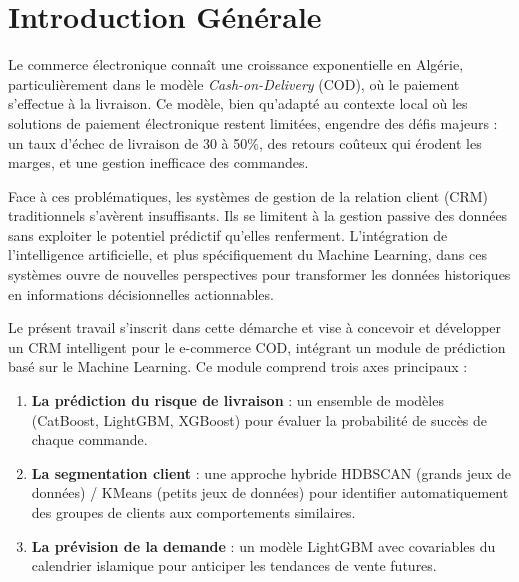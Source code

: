 \documentclass[12pt,a4paper]{report}
\begin{document}

\tableofcontents
\newpage

\listoffigures
\newpage

\listoftables
\newpage


\chapter*{Introduction G\'{e}n\'{e}rale}

Le commerce \'{e}lectronique conna\^{i}t une croissance exponentielle en Alg\'{e}rie, particuli\`{e}rement dans le mod\`{e}le \textit{Cash-on-Delivery} (COD), o\`{u} le paiement s'effectue \`{a} la livraison. Ce mod\`{e}le, bien qu'adapt\'{e} au contexte local o\`{u} les solutions de paiement \'{e}lectronique restent limit\'{e}es, engendre des d\'{e}fis majeurs : un taux d'\'{e}chec de livraison de 30 \`{a} 50\%, des retours co\^{u}teux qui \'{e}rodent les marges, et une gestion inefficace des commandes.

Face \`{a} ces probl\'{e}matiques, les syst\`{e}mes de gestion de la relation client (CRM) traditionnels s'av\`{e}rent insuffisants. Ils se limitent \`{a} la gestion passive des donn\'{e}es sans exploiter le potentiel pr\'{e}dictif qu'elles renferment. L'int\'{e}gration de l'intelligence artificielle, et plus sp\'{e}cifiquement du Machine Learning, dans ces syst\`{e}mes ouvre de nouvelles perspectives pour transformer les donn\'{e}es historiques en informations d\'{e}cisionnelles actionnables.

Le pr\'{e}sent travail s'inscrit dans cette d\'{e}marche et vise \`{a} concevoir et d\'{e}velopper un CRM intelligent pour le e-commerce COD, int\'{e}grant un module de pr\'{e}diction bas\'{e} sur le Machine Learning. Ce module comprend trois axes principaux :

\begin{enumerate}
  \item \textbf{La pr\'{e}diction du risque de livraison} : un ensemble de mod\`{e}les (CatBoost, LightGBM, XGBoost) pour \'{e}valuer la probabilit\'{e} de succ\`{e}s de chaque commande.
  \item \textbf{La segmentation client} : une approche hybride HDBSCAN (grands jeux de donn\'{e}es) / KMeans (petits jeux de donn\'{e}es) pour identifier automatiquement des groupes de clients aux comportements similaires.
  \item \textbf{La pr\'{e}vision de la demande} : un mod\`{e}le LightGBM avec covariables du calendrier islamique pour anticiper les tendances de vente futures.
\end{enumerate}
\end{document}
